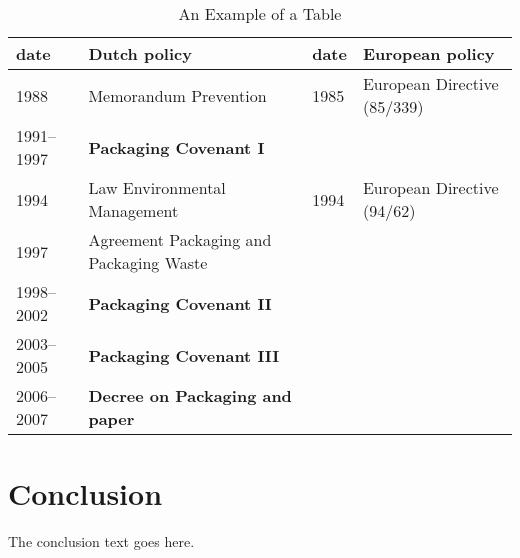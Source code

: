 \documentclass[]{rsos}%
\begin{document}
\begin{table}[!h]
\caption{An Example of a Table}%
\label{table_example}
\begin{tabular}{llll}%
\hline
date &Dutch policy &date &European policy \\
\hline
1988 &Memorandum Prevention &1985 &European Directive (85/339) \\
1991--1997 &{\bf Packaging Covenant I} & & \\
1994 &Law Environmental Management &1994 &European Directive (94/62) \\
1997 &Agreement Packaging and Packaging Waste & & \\
1998--2002 &{\bf Packaging Covenant II} & & \\
2003--2005 &{\bf Packaging Covenant III} & & \\
2006--2007 &{\bf Decree on Packaging and paper} & & \\\hline
\end{tabular}
\end{table}%

\section{Conclusion}
The conclusion text goes here.

\vskip1pc









\pagebreak


\end{document}
